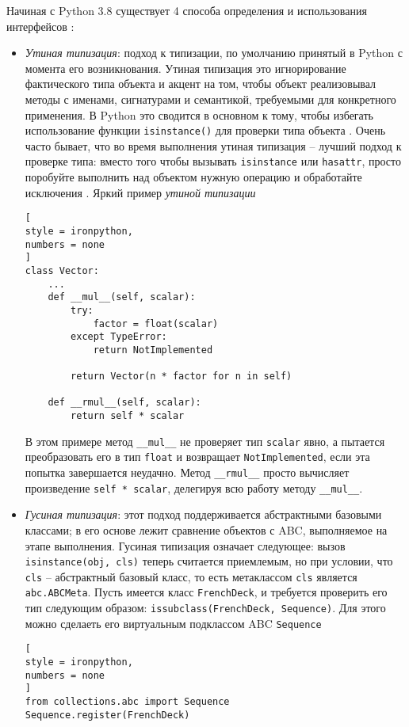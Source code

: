 \documentclass[%
	11pt,
	a4paper,
	utf8,
		]{article}
\begin{document}
Начиная с Python 3.8 существует 4 способа определения и использования интерфейсов \cite[]{ramalho:python-2022}:
\begin{itemize}
	\item \emph{Утиная типизация}: подход к типизации, по умолчанию принятый в Python с момента его возникнования. Утиная типизация это игнорирование фактического типа объекта и акцент на том, чтобы объект реализовывал методы с именами, сигнатурами и семантикой, требуемыми для конкретного применения. В Python это сводится в основном к тому, чтобы избегать использование функции \verb*|isinstance()| для проверки типа объекта \cite[]{ramalho:python-2022}. Очень часто бывает, что во время выполнения утиная типизация -- лучший подход к проверке типа: вместо того чтобы вызывать \verb|isinstance| или \verb*|hasattr|, просто поробуйте выполнить над объектом нужную операцию и обработайте исключения \cite[]{ramalho:python-2022}. Яркий пример \emph{утиной типизации}
\begin{lstlisting}[
style = ironpython,
numbers = none	
]
class Vector:
	...
	def __mul__(self, scalar):
	    try:
	        factor = float(scalar)
	    except TypeError:
	        return NotImplemented
	    
	    return Vector(n * factor for n in self)
	
	def __rmul__(self, scalar):
	    return self * scalar
\end{lstlisting}

В этом примере метод \verb|__mul__| не проверяет тип \verb*|scalar| явно, а пытается преобразовать его в тип \verb|float| и возвращает \verb*|NotImplemented|, если эта попытка завершается неудачно. Метод \verb|__rmul__| просто вычисляет произведение \verb*|self * scalar|, делегируя всю работу методу \verb|__mul__|.
	
	\item \emph{Гусиная типизация}: этот подход поддерживается абстрактными базовыми классами; в его основе лежит сравнение объектов с ABC, выполняемое на этапе выполнения. Гусиная типизация означает следующее: вызов \verb|isinstance(obj, cls)| теперь считается приемлемым, но при условии, что \verb*|cls| -- абстрактный базовый класс, то есть метаклассом \verb*|cls| является \verb|abc.ABCMeta|. Пусть имеется класс \verb*|FrenchDeck|, и требуется проверить его тип следующим образом: \verb|issubclass(FrenchDeck, Sequence)|. Для этого можно сделаеть его виртуальным подклассом ABC \verb*|Sequence|
\begin{lstlisting}[
style = ironpython,
numbers = none
]
from collections.abc import Sequence
Sequence.register(FrenchDeck)
\end{lstlisting}


\end{itemize}
\end{document}
